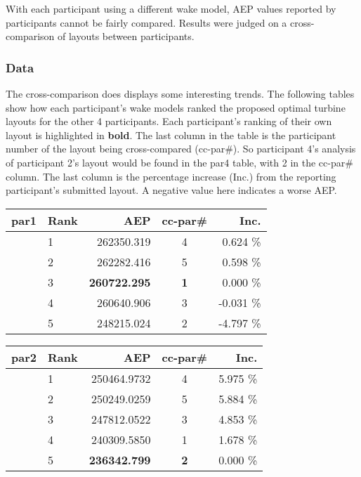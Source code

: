 	With each participant using a different wake model, AEP values reported by participants cannot be fairly compared.
	Results were judged on a cross-comparison of layouts between participants.

	\subsubsection{Data}

	The cross-comparison does displays some interesting trends.
	The following tables show how each participant's wake models ranked the proposed optimal turbine layouts for the other 4 participants.
	Each participant's ranking of their own layout is highlighted in \textbf{bold}.
	The last column in the table is the participant number of the layout being cross-compared (cc-par\#).
	So participant 4's analysis of participant 2's layout would be found in the par4 table, with 2 in the cc-par\# column.
	The last column is the percentage increase (Inc.) from the reporting participant's submitted layout.
	A negative value here indicates a worse AEP.

		\newpage
		\begin{table}[H]
			\begin{center}
				\begin{tabular}{r l r c r}
					par1 	& Rank	& AEP					& cc-par\#	& Inc.\\
					\hline
							& 1		& 262350.319			& 4 		& 0.624 \%\\	
							& 2		& 262282.416			& 5 		& 0.598 \%\\
							& 3		& \textbf{260722.295}	& \textbf{1}& 0.000 \%\\
							& 4		& 260640.906			& 3 		&-0.031 \%\\
							& 5		& 248215.024			& 2 		&-4.797 \%\\
					\hline
				\end{tabular}
			\end{center}
		\end{table}

		\begin{table}[H]
			\begin{center}
				\begin{tabular}{r l r c r}
					par2 	& Rank	& AEP					& cc-par\#	& Inc. \\
					\hline
							& 1		& 250464.9732			& 4 		& 5.975 \%\\	
							& 2		& 250249.0259			& 5 		& 5.884 \%\\
							& 3		& 247812.0522			& 3 		& 4.853 \%\\
							& 4		& 240309.5850			& 1 		& 1.678 \%\\
							& 5		& \textbf{236342.799}	& \textbf{2}& 0.000 \%\\
					\hline
				\end{tabular}
			\end{center}
		\end{table}

